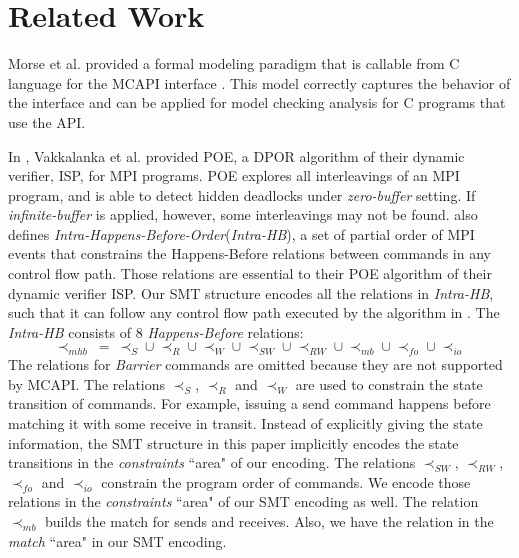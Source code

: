 \section{Related Work}
Morse et al. provided a formal modeling paradigm that is callable from C language for the MCAPI interface \cite{morse:vmcai12}. This model correctly captures the behavior of the interface and can be applied for model checking analysis for C programs that use the API.

In \cite{sarvani:fm09}, Vakkalanka et al. provided POE, a DPOR algorithm \cite{flanagan:popl05} of their dynamic verifier, ISP, for MPI programs. POE explores all interleavings of an MPI program, and is able to detect hidden deadlocks under \textit{zero-buffer} setting. If \textit{infinite-buffer} is applied, however, some interleavings may not be found. \cite{sarvani:fm09} also defines \textit{Intra-Happens-Before-Order}(\textit{Intra-HB}), a set of partial order of MPI events that constrains the Happens-Before relations between commands in any control flow path. Those relations are essential to their POE algorithm of their dynamic verifier ISP. Our SMT structure encodes all the relations in \textit{Intra-HB}, such that it can follow any control flow path executed by the algorithm in \cite{sarvani:fm09}. The \textit{Intra-HB} consists of 8 \textit{Happens-Before} relations:
\[\prec_{mhb}\ =\ \prec_S \cup \prec_R \cup \prec_W \cup \prec_{SW} \cup \prec_{RW} \cup \prec_{mb} \cup \prec_{fo} \cup \prec_{io} \]
The relations for \textit{Barrier} commands are omitted because they are not supported by MCAPI. The relations $\prec_S$, $\prec_R$ and $\prec_W$ are used to constrain the state transition of commands. For example, issuing a send command happens before matching it with some receive in transit. Instead of explicitly giving the state information, the SMT structure in this paper implicitly encodes the state transitions in the \textit{constraints} ``area" of our encoding. The relations $\prec_{SW}$, $\prec_{RW}$, $\prec_{fo}$ and $\prec_{io}$ constrain the program order of commands. We encode those relations in the \textit{constraints} ``area" of our SMT encoding as well. The relation $\prec_{mb}$ builds the match for sends and receives. Also, we have the relation in the \textit{match} ``area" in our SMT encoding.

